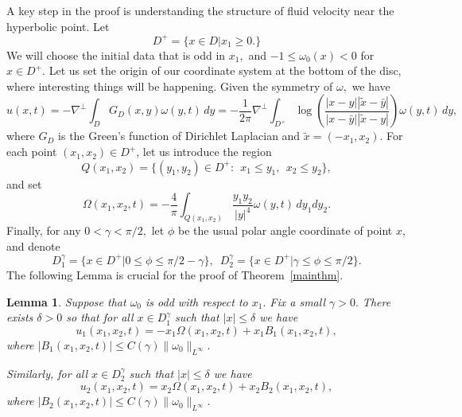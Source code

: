 \documentclass[reqno,centertags, 11pt]{amsart}
\newtheorem{lemma}[theorem]{Lemma}
\newcommand{\be}{\mathbf e} \newcommand{\bh}{\mathbf h}
\newcommand{\lb}{\label}
\renewcommand{\be}{\begin{equation}}
\newcommand{\ee}{\end{equation}}
\begin{document}
A key step in the proof is understanding the structure of fluid velocity near the hyperbolic point.
Let \[ D^+ = \{ x \in D \left| x_1 \geq 0. \right. \} \]
We will choose the initial data that is odd in $x_1,$ and $-1 \leq \omega_0(x)< 0$ for $x \in D^+.$
Let us set the origin of our coordinate system at the bottom of the disc, where interesting things will be happening.
Given the symmetry of $\omega,$ we have
\begin{equation}\label{BioS23}
u(x,t) = -\nabla^\perp \int_D G_D(x,y)\omega(y,t)\,dy =
-\frac{1}{2\pi} \nabla^\perp \int_{D^+}
\log\left(\frac{|x-y||\tilde{x}-\bar{y}|}{|x-\bar{y}||\tilde{x}-y|}\right)
\omega(y,t)\,dy,
\end{equation}
where $G_D$ is the Green's function of Dirichlet Laplacian and $\tilde{x} = (-x_1,x_2).$
For each point $(x_1,x_2)\in D^+$, let us introduce the region
\[
Q(x_1,x_2)=\{(y_1,y_2)\in D^+:~~x_1 \leq y_1,~~x_2 \leq y_2\},
\]
and set
\be\lb{omegamain}
\Omega(x_1,x_2,t) = -\frac{4}{\pi}\int_{Q(x_1,x_2)}
\frac{y_1y_2}{|y|^4} \omega(y,t)\,dy_1dy_2.
\ee
Finally, for any $0<\gamma<\pi/2,$ let $\phi$ be the usual polar angle coordinate of point $x$,
and denote
\[ D_1^\gamma = \{ x \in D^+ \left| 0\le\phi\le\pi/2-\gamma \right. \}, \,\,\,
 D_2^\gamma = \{ x \in D^+ \left| \gamma\le\phi\le\pi/2 \right. \}. \]
The following Lemma is crucial for the proof of Theorem~\ref{mainthm}.
\begin{lemma}\label{mainlemma}
Suppose that $\omega_0$ is odd with respect to $x_1.$ Fix a small $\gamma>0.$
There exists $\delta >0$ so that for all
$x \in D^\gamma_1$ such that $|x| \leq \delta$ we have
\begin{equation}\label{velest1}
u_1(x_1,x_2,t) = - x_1 \Omega(x_1,x_2,t) + x_1 B_1(x_1,x_2,t),
\end{equation}
where $|B_1(x_1,x_2,t)| \leq C(\gamma)\|\omega_0\|_{L^\infty}.$

Similarly, for all $x \in D^\gamma_2$ such
that $|x| \leq \delta$ we have
\begin{equation}\label{velest2}
u_2(x_1,x_2,t) = x_2\Omega(x_1,x_2,t) + x_2 B_2(x_1,x_2,t),
\end{equation}
where $|B_2(x_1,x_2,t)| \leq C(\gamma)\|\omega_0\|_{L^\infty}.$
\end{lemma}
\end{document}

